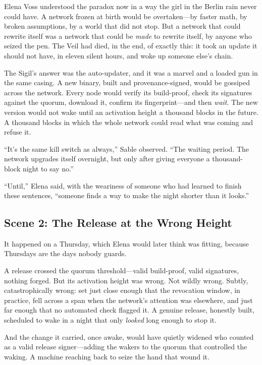 \documentclass[12pt,letterpaper]{book}
\begin{document}
Elena Voss understood the paradox now in a way the girl in the Berlin rain never
could have. A network frozen at birth would be overtaken---by faster math, by
broken assumptions, by a world that did not stop. But a network that could rewrite
itself was a network that could be \emph{made} to rewrite itself, by anyone who
seized the pen. The Veil had died, in the end, of exactly this: it took an update
it should not have, in eleven silent hours, and woke up someone else's chain.

The Sigil's answer was the auto-updater, and it was a marvel and a loaded gun in
the same casing. A new binary, built and provenance-signed, would be gossiped
across the network. Every node would verify its build-proof, check its
signatures against the quorum, download it, confirm its fingerprint---and then
\emph{wait}. The new version would not wake until an activation height a thousand
blocks in the future. A thousand blocks in which the whole network could read what
was coming and refuse it.

``It's the same kill switch as always,'' Sable observed. ``The waiting period. The
network upgrades itself overnight, but only after giving everyone a thousand-block
night to say no.''

``Until,'' Elena said, with the weariness of someone who had learned to finish
these sentences, ``someone finds a way to make the night shorter than it looks.''

\hypertarget{scene-2-the-release-at-the-wrong-height}{%
\subsection{Scene 2: The Release at the Wrong
Height}\label{scene-2-the-release-at-the-wrong-height}}

It happened on a Thursday, which Elena would later think was fitting, because
Thursdays are the days nobody guards.

A release crossed the quorum threshold---valid build-proof, valid signatures,
nothing forged. But its activation height was wrong. Not wildly wrong. Subtly,
catastrophically wrong: set just close enough that the revocation window, in
practice, fell across a span when the network's attention was elsewhere, and just
far enough that no automated check flagged it. A genuine release, honestly built,
scheduled to wake in a night that only \emph{looked} long enough to stop it.

And the change it carried, once awake, would have quietly widened who counted as a
valid release signer---adding the wakers to the quorum that controlled the waking.
A machine reaching back to seize the hand that wound it.
\end{document}
